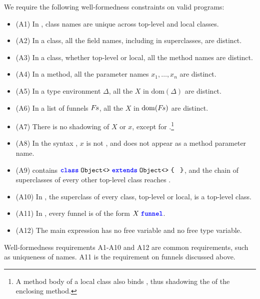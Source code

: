 We require the following well-formedness constraints on valid programs:
\begin{itemize}
    \item (A1)  In \decls, class names are unique across top-level and local classes.
    \item (A2)  In a class, all the field names, including in superclasses, are distinct.
    \item (A3)  In a class, whether top-level or local, all the method names are distinct.
    \item (A4)  In a method, all the parameter names $x_1,\ldots,x_n$ are distinct.
    \item (A5)  In a type environment $\Delta$, all the $X$ in $\mathrm{dom}(\Delta)$ are distinct.
    \item (A6)  In a list of funnels $F\mkern-2mu s$, all the $X$ in $\mathrm{dom}(F\mkern-2mu s)$ are distinct.
    \item (A7)  There is no shadowing of $X$ or $x$, except for \Q@this@.\footnote{A method body of a local class also binds \Q@this@, thus shadowing the \Q@this@ of the enclosing method.}
    \item (A8)  In the syntax , $x$ is not \Q@this@, and \Q@this@ does not appear as a method parameter name.
    \item (A9)  \decls contains $\subclass{\Object}{}{\Object}{}{}{}$, and the chain of superclasses of every other top-level class reaches \Q@Object@.
    \item (A10)  In \decls, the superclass of every class, top-level or local, is a top-level class.
    \item (A11)  In \decls, every funnel is of the form $X\mskip5mu\text{\ttfamily\bfseries\color{blue}funnel}$.
    \item (A12)  The main expression has no free variable and no free type variable.
\end{itemize}
Well-formedness requirements A1-A10 and A12 are common requirements, such as uniqueness of names.
A11 is the requirement on funnels discussed above.



